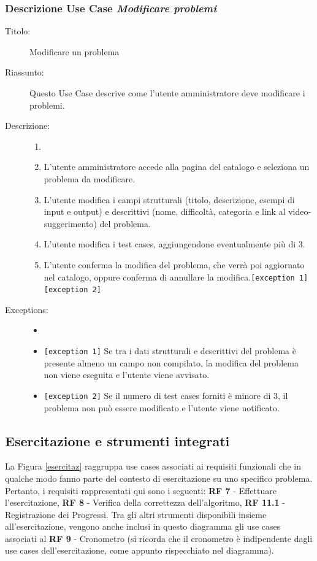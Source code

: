 \documentclass[11pt, a4paper]{article}
\theoremstyle{definition} %
\begin{document}
\subsubsection*{Descrizione Use Case \textit{Modificare problemi}}
\begin{description}
    \item[Titolo:] Modificare un problema
    
    \item[Riassunto:] Questo Use Case descrive come l'utente amministratore
    deve modificare i problemi.

    \item[Descrizione:]
    \begin{enumerate}
        \item[]
        \item L'utente amministratore accede alla pagina del catalogo e seleziona un problema da modificare.
        \item L'utente modifica i campi strutturali (titolo, descrizione, esempi di input e output) e descrittivi (nome, difficoltà, categoria e link al video-suggerimento) del problema.
        \item L'utente modifica i test cases, aggiungendone eventualmente più di 3.
        \item L'utente conferma la modifica del problema, che verrà poi aggiornato nel catalogo, oppure conferma di annullare la modifica.\texttt{[exception 1]} \texttt{[exception 2]}
    \end{enumerate}
    
    \item[Exceptions:]
    \begin{itemize}
        \item[]
        \item \texttt{[exception 1]} Se tra i dati strutturali e descrittivi del problema è presente almeno un campo non compilato, la modifica del problema non viene eseguita e l'utente viene avvisato.
        \item \texttt{[exception 2]} Se il numero di test cases forniti è minore di 3, il problema non può essere modificato e l'utente viene notificato.
    \end{itemize}
\end{description}

\newpage
\subsection{Esercitazione e strumenti integrati}
La Figura \ref{esercitaz} raggruppa use cases associati ai requisiti funzionali
che in qualche modo fanno parte del contesto di esercitazione su uno specifico problema. Pertanto,
i requisiti rappresentati qui sono i seguenti: \textbf{RF 7} - Effettuare l'esercitazione,
\textbf{RF 8} - Verifica della correttezza dell'algoritmo, \textbf{RF 11.1} - Registrazione dei
Progressi. Tra gli altri strumenti disponibili insieme all'esercitazione,
vengono anche inclusi in questo diagramma gli use cases associati al
\textbf{RF 9} - Cronometro (si ricorda che il cronometro è indipendente dagli
use cases dell'esercitazione, come appunto rispecchiato nel diagramma).
\end{document}
